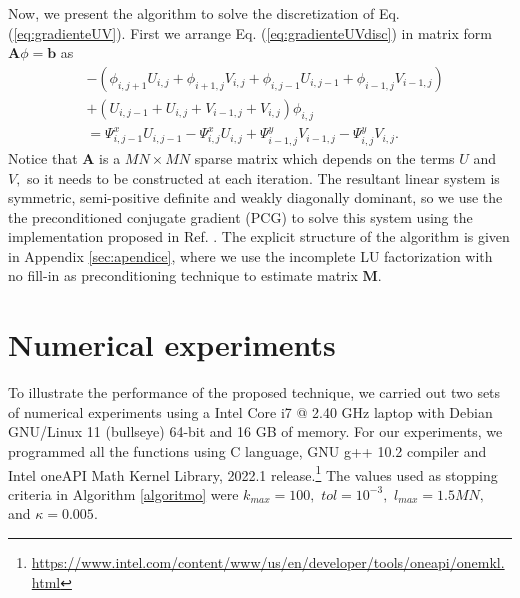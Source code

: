 \documentclass[12pt,letterpaper]{article}
\begin{document}
Now, we present the algorithm to solve the discretization of Eq. (\ref{eq:gradienteUV}). First we arrange Eq. (\ref{eq:gradienteUVdisc}) in  matrix form $\mathbf{A}\phi = \mathbf{b}$ as
\begin{equation}\label{eq:Axb}
  \begin{aligned}
  &-\left(\phi_{i,j+1}U_{i,j} + \phi_{i+1,j}V_{i,j} + \phi_{i,j-1}U_{i,j-1} + \phi_{i-1,j}V_{i-1,j}\right)\\
  &+\left(U_{i,j-1} + U_{i,j} + V_{i-1,j} + V_{i,j}\right)\phi_{i,j}\\
  &= \Psi_{i,j-1}^{x}U_{i,j-1} - \Psi_{i,j}^{x}U_{i,j} + \Psi_{i-1,j}^{y}V_{i-1,j} - \Psi_{i,j}^{y}V_{i,j}.
  \end{aligned}
\end{equation}
Notice that $\mathbf{A}$ is a $MN\times MN$ sparse matrix which depends on the terms $U$ and $V,$ so it needs to be constructed at each iteration.  The resultant linear system is symmetric, semi-positive definite and weakly diagonally dominant, so we use the the preconditioned conjugate gradient (PCG) to solve this system using the implementation proposed in Ref. . The explicit structure  of the algorithm is given in Appendix \ref{sec:apendice}, where we use the incomplete LU factorization with no fill-in as preconditioning technique to estimate matrix $\mathbf{M}.$~\cite{VanderVorst2003,Saad2003,Chen2005a,Legarda-Saenz2022}



\section{Numerical experiments}\label{sec:experiment}
To illustrate the performance of the proposed technique, we carried out two sets of numerical experiments using a Intel\textsuperscript{\tiny\textregistered} Core\textsuperscript{\tiny\texttrademark} i7 @ 2.40 GHz laptop with Debian GNU/Linux 11 (bullseye) 64-bit and 16 GB of memory. For our experiments, we programmed all the functions using C language, GNU g++ 10.2 compiler and Intel\textsuperscript{\tiny\textregistered} oneAPI Math Kernel Library, 2022.1 release.\footnote{\url{https://www.intel.com/content/www/us/en/developer/tools/oneapi/onemkl.html}}  The values used as stopping criteria in Algorithm \ref{algoritmo} were $ k_{max} = 100,$ $tol = 10^{-3},$ $l_{max} = 1.5MN,$ and $\kappa = 0.005.$
\end{document}
